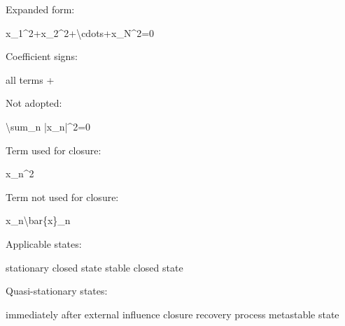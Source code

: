 \documentclass[
  a4paper,
]{article}
\newenvironment{Shaded}{}{}
\newcommand{\NormalTok}[1]{#1}
\begin{document}
Expanded form:

\begin{Shaded}
\begin{Highlighting}[]
\NormalTok{x\_1\^{}2+x\_2\^{}2+\textbackslash{}cdots+x\_N\^{}2=0}
\end{Highlighting}
\end{Shaded}

Coefficient signs:

\begin{Shaded}
\begin{Highlighting}[]
\NormalTok{all terms +}
\end{Highlighting}
\end{Shaded}

Not adopted:

\begin{Shaded}
\begin{Highlighting}[]
\NormalTok{\textbackslash{}sum\_n |x\_n|\^{}2=0}
\end{Highlighting}
\end{Shaded}

Term used for closure:

\begin{Shaded}
\begin{Highlighting}[]
\NormalTok{x\_n\^{}2}
\end{Highlighting}
\end{Shaded}

Term not used for closure:

\begin{Shaded}
\begin{Highlighting}[]
\NormalTok{x\_n\textbackslash{}bar\{x\}\_n}
\end{Highlighting}
\end{Shaded}

Applicable states:

\begin{Shaded}
\begin{Highlighting}[]
\NormalTok{stationary closed state}
\NormalTok{stable closed state}
\end{Highlighting}
\end{Shaded}

Quasi-stationary states:

\begin{Shaded}
\begin{Highlighting}[]
\NormalTok{immediately after external influence}
\NormalTok{closure recovery process}
\NormalTok{metastable state}
\end{Highlighting}
\end{Shaded}
\end{document}
